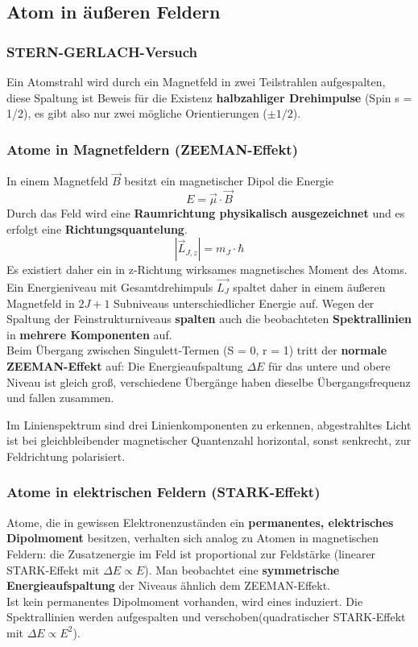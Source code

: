 \documentclass[12pt,a4paper,ngerman]{article}
\begin{document}
\subsection{Atom in äußeren Feldern}
\subsubsection*{STERN-GERLACH-Versuch}
Ein Atomstrahl wird durch ein Magnetfeld in zwei Teilstrahlen aufgespalten, diese Spaltung ist Beweis für die Existenz \textbf{halbzahliger Drehimpulse} (Spin s = 1/2), es gibt also nur zwei mögliche Orientierungen ($\pm 1/2$). 

\subsubsection*{Atome in Magnetfeldern (ZEEMAN-Effekt)}
In einem Magnetfeld $\vec{B}$ besitzt ein magnetischer Dipol die Energie
\begin{equation}
E = \vec{\mu} \cdot \vec{B}
\end{equation}
Durch das Feld wird eine \textbf{Raumrichtung physikalisch ausgezeichnet} und es erfolgt eine \textbf{Richtungsquantelung}.
\begin{equation}
|\vec{L}_{J,z}| = m_J \cdot \hbar
\end{equation}
Es existiert daher ein in z-Richtung wirksames magnetisches Moment des Atoms. Ein Energieniveau mit Gesamtdrehimpuls $\vec{L_J}$ spaltet daher in einem äußeren Magnetfeld in $2J+1$ Subniveaus unterschiedlicher Energie auf. Wegen der Spaltung der Feinstrukturniveaus \textbf{spalten }auch die beobachteten \textbf{Spektrallinien} in \textbf{mehrere Komponenten} auf. \\
Beim Übergang zwischen Singulett-Termen (S = 0, r = 1) tritt der \textbf{normale ZEEMAN-Effekt} auf: Die Energieaufspaltung $\Delta E$ für das untere und obere Niveau ist gleich groß, verschiedene Übergänge haben dieselbe Übergangsfrequenz und fallen zusammen. 

Im Linienspektrum sind drei Linienkomponenten zu erkennen, abgestrahltes Licht ist bei gleichbleibender magnetischer Quantenzahl horizontal, sonst senkrecht, zur Feldrichtung polarisiert. 

\subsubsection*{Atome in elektrischen Feldern (STARK-Effekt)}
Atome, die in gewissen Elektronenzuständen ein \textbf{permanentes, elektrisches Dipolmoment} besitzen, verhalten sich analog zu Atomen in magnetischen Feldern: die Zusatzenergie im Feld ist proportional zur Feldstärke (linearer STARK-Effekt mit $\Delta E \propto E$). Man beobachtet eine \textbf{symmetrische Energieaufspaltung} der Niveaus ähnlich dem ZEEMAN-Effekt. \\
Ist kein permanentes Dipolmoment vorhanden, wird eines induziert. Die Spektrallinien werden aufgespalten und verschoben(quadratischer STARK-Effekt mit $\Delta E \propto E^2$). 
\end{document}
